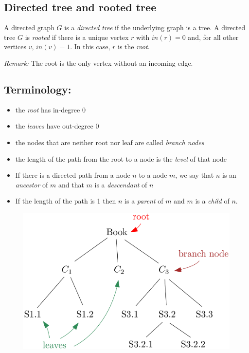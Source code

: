 \documentclass[11pt]{article}
\begin{document}
    \subsection{Directed tree and rooted tree}

    A directed graph $G$ is a \emph{directed tree} if the underlying graph is a tree. A directed tree $G$ is \emph{rooted} if there is a unique vertex $r$ with \(in(r) = 0\) and, for all other vertices $v$, \(in(v) = 1\). In this case, $r$ is the \emph{root}. 

    \vspace{1em}

    \emph{Remark:} The root is the only vertex without an incoming edge. 

    \subsection{Terminology:}
    \begin{itemize}
        \item the \emph{root} has in-degree 0
        \item the \emph{leaves} have out-degree 0
        \item the nodes that are neither root nor leaf are called \emph{branch nodes}
        \item the length of the path from the root to a node is the \emph{level} of that node
        \item If there is a directed path from a node $n$ to a node $m$, we say that $n$ is an \emph{ancestor} of $m$ and that $m$ is a \emph{descendant} of $n$
        \item If the length of the path is 1 then $n$ is a \emph{parent} of $m$ and $m$ is a \emph{child} of $n$. 
    \end{itemize}

    \begin{figure}[H]
        \centering
        \includegraphics[scale=0.2]{root.png}
    \end{figure}
\end{document}
